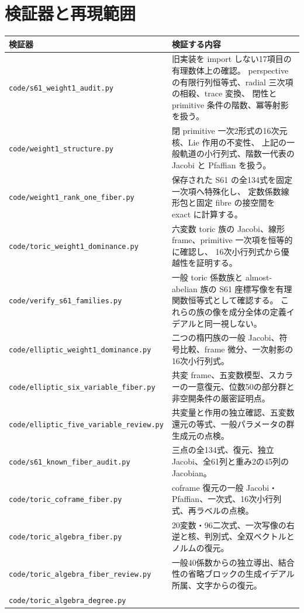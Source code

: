 \documentclass[11pt,a4paper]{ltjsarticle}
\theoremstyle{remark}
\begin{document}
\section{検証器と再現範囲}
\begin{longtable}{@{}p{58mm}p{98mm}@{}}
\toprule
検証器 & 検証する内容\\\midrule\endhead
\nolinkurl{code/s61_weight1_audit.py} &
旧実装を import しない17項目の有理数体上の確認。
perspective の有限行列恒等式、radial 三次項の相殺、trace 変換、
閉性と primitive 条件の階数、冪等射影を扱う。\\
\nolinkurl{code/weight1_structure.py} &
閉 primitive 一次2形式の16次元核、Lie 作用の不変性、
上記の一般軌道の小行列式、階数一代表の Jacobi と Pfaffian を扱う。\\
\nolinkurl{code/weight1_rank_one_fiber.py} &
保存された S61 の全134式を固定一次項へ特殊化し、
定数係数線形包と固定 fibre の接空間を exact に計算する。\\
\nolinkurl{code/toric_weight1_dominance.py} &
六変数 toric 族の Jacobi、線形 frame、primitive 一次項を恒等的に確認し、
16次小行列式から優越性を証明する。\\
\nolinkurl{code/verify_s61_families.py} &
一般 toric 係数族と almost-abelian 族の S61 座標写像を有理関数恒等式として確認する。
これらの族の像を成分全体の定義イデアルと同一視しない。\\
\nolinkurl{code/elliptic_weight1_dominance.py} &
二つの楕円族の一般 Jacobi、符号比較、frame 微分、一次射影の16次小行列式。\\
\nolinkurl{code/elliptic_six_variable_fiber.py} &
共変 frame、五変数模型、スカラーの一意復元、位数50の部分群と非空開条件の厳密証明点。\\
\nolinkurl{code/elliptic_five_variable_review.py} &
共変量と作用の独立確認、五変数還元の等式、一般パラメータの群生成元の点検。\\
\nolinkurl{code/s61_known_fiber_audit.py} &
三点の全134式、復元、独立 Jacobi、全61列と重み2の45列の Jacobian。\\
\nolinkurl{code/toric_coframe_fiber.py} &
coframe 復元の一般 Jacobi・Pfaffian、一次式、16次小行列式、再ラベルの点検。\\
\nolinkurl{code/toric_algebra_fiber.py} &
20変数・96二次式、一次写像の右逆と核、判別式、全双ベクトルとノルムの復元。\\
\nolinkurl{code/toric_algebra_fiber_review.py} &
一般40係数からの独立導出、結合性の省略ブロックの生成イデアル所属、文字からの復元。\\
\nolinkurl{code/toric_algebra_degree.py} &

\end{longtable}
\end{document}
